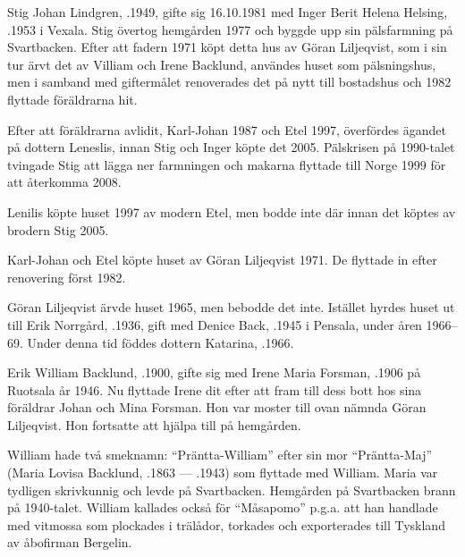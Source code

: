 


Stig Johan Lindgren, .1949, gifte sig 16.10.1981 med Inger Berit Helena Helsing, .1953 i Vexala. Stig övertog hemgården 1977 och byggde upp sin pälsfarmning på Svartbacken. Efter att fadern 1971 köpt detta hus av Göran Liljeqvist, som i sin tur ärvt det av Villiam och Irene Backlund, användes huset som pälsningshus, men i samband med giftermålet renoverades det på nytt till bostadshus och 1982 flyttade föräldrarna hit.

Efter att föräldrarna avlidit, Karl-Johan 1987 och Etel 1997, överfördes ägandet på dottern Leneslis, innan Stig och Inger köpte det 2005. Pälskrisen på 1990-talet tvingade Stig att lägga ner farmningen och makarna flyttade till Norge 1999 för att återkomma 2008.


Lenilis köpte huset 1997 av modern Etel, men bodde inte där innan det köptes av brodern Stig 2005.\jhvspace{}


Karl-Johan och Etel köpte huset av Göran Liljeqvist 1971. De flyttade in efter renovering först 1982.\jhvspace{}


Göran Liljeqvist ärvde huset 1965, men bebodde det inte. Istället hyrdes huset ut till Erik Norrgård, .1936, gift med Denice Back, .1945 i Pensala, under åren 1966--69. Under denna tid föddes dottern Katarina, .1966.


Erik William Backlund, .1900, gifte sig med Irene Maria Forsman, .1906 på Ruotsala år 1946. Nu flyttade Irene dit efter att fram till dess bott hos sina föräldrar Johan och Mina Forsman. Hon var moster till ovan nämnda Göran Liljeqvist. Hon fortsatte att hjälpa till på hemgården.

William hade två smeknamn: ``Präntta-William'' efter sin mor ``Präntta-Maj'' (Maria Lovisa Backlund, .1863 --- .1943) som flyttade med William. Maria var tydligen skrivkunnig och levde på Svartbacken. Hemgården på Svartbacken brann på 1940-talet. William kallades också för ``Måsapomo'' p.g.a. att han handlade med vitmossa som plockades i trälådor, torkades och exporterades till Tyskland av åbofirman Bergelin.

